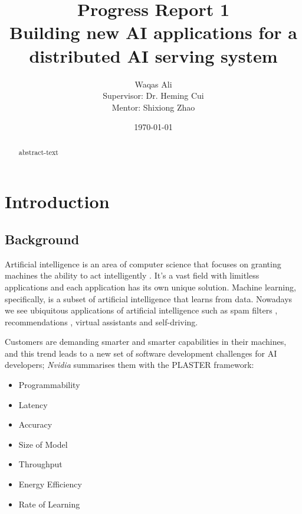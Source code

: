 \documentclass{report}
\title{Progress Report 1 \\ Building new AI applications for a distributed AI serving system}
\author{Waqas Ali\\{\small Supervisor: Dr. Heming Cui}\\{\small Mentor: Shixiong Zhao}}
\date{\today}
\def\frontmatter{%
    \pagenumbering{roman}
    \setcounter{page}{1}
    \renewcommand{\thesection}{\Roman{section}}
}%
\def\mainmatter{%
    \pagenumbering{arabic}
    \setcounter{page}{1}
    \setcounter{section}{0}
    \renewcommand{\thesection}{\thechapter.\arabic{section}}
}%
\begin{document}
\maketitle

\frontmatter

\begin{abstract}
\thispagestyle{plain}
abstract-text
\end{abstract}

\setcounter{page}{2}
\tableofcontents

\newpage
{}
\listoffigures

\newpage
{}
\listoftables

\newpage
\mainmatter

\chapter{Introduction}

\section{Background}
Artificial intelligence is an area of computer science that focuses on granting machines the ability to act intelligently \cite{McCarthy2007}. It's a vast field with limitless applications and each application has its own unique solution. Machine learning, specifically, is a subset of artificial intelligence that learns from data. \cite{Mitchell1997} Nowadays we see ubiquitous applications of artificial intelligence such as spam filters \cite{Androutsopoulos2000},  recommendations \cite{lekakos2008hybrid}, virtual assistants and self-driving.

Customers are demanding smarter and smarter capabilities in their machines, and this trend leads to a new set of software development challenges for AI developers; \textit{Nvidia} summarises them with the PLASTER \cite{Teich2018} framework:
\begin{itemize}
  \item Programmability
  \item Latency
  \item Accuracy
  \item Size of Model
  \item Throughput
  \item Energy Efficiency
  \item Rate of Learning
\end{itemize}
\end{document}
